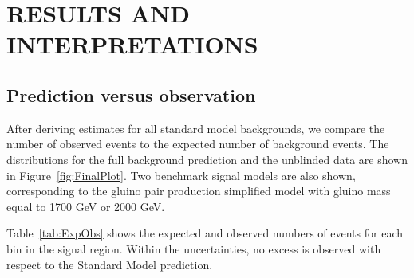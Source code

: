 \chapter{RESULTS AND INTERPRETATIONS}
\label{chap:Results}


\section{Prediction versus observation}
\label{sec:fullCount}
After deriving estimates for all standard model backgrounds, we compare the number of 
observed events to the expected number of background events. 
The \ETmiss distributions for the full background prediction and the unblinded data are
shown in Figure~\ref{fig:FinalPlot}. Two benchmark signal models are also shown, 
corresponding to the gluino pair production simplified model 
 with gluino mass equal to 1700 GeV or 2000 GeV.

Table~\ref{tab:ExpObs} shows the expected and observed numbers of events for each bin in the signal region.
Within the uncertainties, no excess is observed with respect to the Standard Model prediction.


